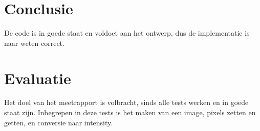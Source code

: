 \documentclass[11pt]{article}
\begin{document}
    \section{Conclusie}\label{sec:conclusie}
    De code is in goede staat en voldoet aan het ontwerp, dus de implementatie is naar weten
    correct.


    \section{Evaluatie}\label{sec:evaluatie}
    Het doel van het meetrapport is volbracht, sinds alle tests werken en in goede staat zijn.
    Inbegrepen in deze tests is het maken van een image, pixels zetten en getten, en conversie
    naar intensity.
\end{document}

